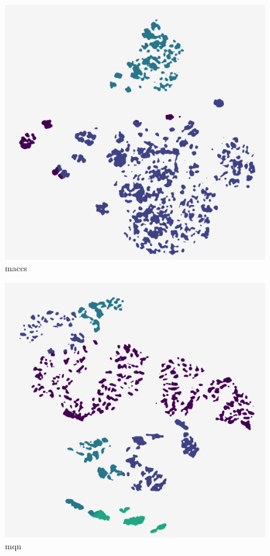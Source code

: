 \begin{subfigure}[b]{.25\linewidth}
    \centering
    \includegraphics[width=\textwidth]{outputs/DRplots/plots/t-SNE_maccs.png}
    \caption{maccs}
    \label{fig:t-SNE_maccs}
\end{subfigure}
\begin{subfigure}[b]{.25\linewidth}
    \centering
    \includegraphics[width=\textwidth]{outputs/DRplots/plots/t-SNE_mqn.png}
    \caption{mqn}
    \label{fig:t-SNE_mqn}
\end{subfigure}
